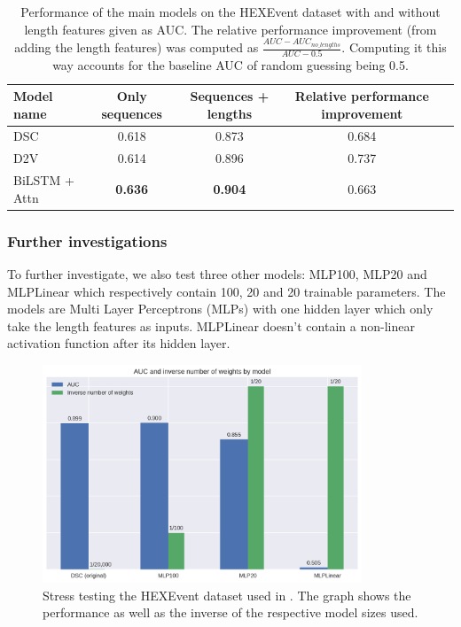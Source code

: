 \begin{table}[h!]
	\centering
	\begin{tabular}{| l | c | c | c| c} 
		\hline
		Model name & Only sequences & Sequences + lengths & Relative performance improvement\\
		\hline
		DSC & 0.618 & 0.873 & 0.684\\
		D2V & 0.614 & 0.896 & 0.737\\
		BiLSTM + Attn & \textbf{0.636} & \textbf{0.904} & 0.663\\
		\hline
	\end{tabular}
	\caption{Performance of the main models on the HEXEvent dataset with and without length features given as AUC. The relative performance improvement (from adding the length features) was computed as $\frac{AUC - AUC_{no\_lengths}}{AUC - 0.5}$. Computing it this way accounts for the baseline AUC of random guessing being 0.5.
	}
	\label{table:results_hexevent}
\end{table}

\subsubsection{Further investigations}
To further investigate, we also test three other models: MLP100, MLP20 and MLPLinear which respectively contain 100, 20 and 20 trainable parameters. The models are Multi Layer Perceptrons (MLPs) with one hidden layer which only take the length features as inputs. MLPLinear doesn't contain a non-linear activation function after its hidden layer.

\begin{figure}
	\centering\includegraphics[width=0.85\textwidth]{../visualizations/ch5-results/dsc_funeral_barchart.png} 
	\caption{Stress testing the HEXEvent dataset used in \cite{dsc}. The graph shows the performance as well as the inverse of the respective model sizes used.}
	\label{fig:dsc_funeral}
\end{figure}

